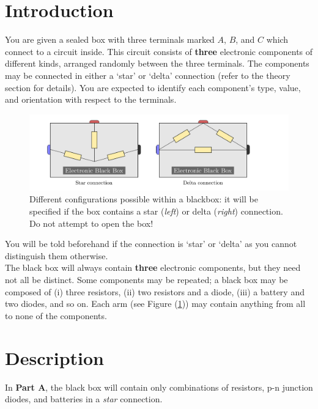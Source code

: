 \section*{Introduction}

You are given a sealed box with three terminals marked $A$, $B$, and $C$ which connect to a circuit inside. This circuit consists of \textbf{three} electronic components of different kinds, arranged randomly between the three terminals. The components may be connected in either a `star' or `delta' connection (refer to the theory section for details). You are expected to identify each component's type, value, and orientation with respect to the terminals. 


\begin{figure}[!htb]
    \centering
    \includegraphics[scale=0.3]{figs/bb.png}
    \caption{Different configurations possible within a blackbox: it will be specified if the box contains a star (\textit{left}) or delta (\textit{right}) connection.  Do not attempt to open the box! }
    \label{fig:bb}
\end{figure}

\begin{imp}

You will be told beforehand if the connection is `star' or `delta' as you cannot distinguish them otherwise.~\\

The black box will always contain \textbf{three} electronic components, but they need not all be distinct. Some components may be repeated; a black box may be composed of (i) three resistors, (ii) two resistors and a diode, (iii) a battery and two diodes, and so on. Each arm (see Figure (\ref{fig:bb})) may contain anything from all to none of the components.
\end{imp}



\section*{Description}

In \textbf{Part A}, the black box will contain only combinations of resistors, p-n junction diodes, and batteries in a \textit{star} connection.

